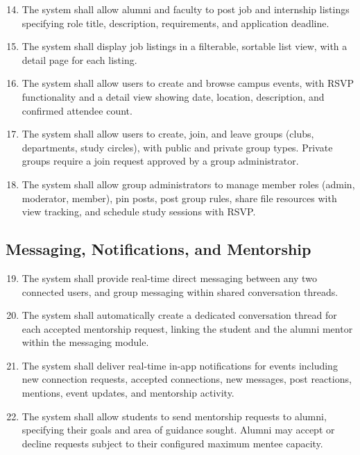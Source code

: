 \documentclass[12pt, a4paper]{article}
\begin{document}
\begin{enumerate}[label=\textbf{FR-\arabic*:}, leftmargin=*, align=left]
\setcounter{enumi}{13}

    \item The system shall allow alumni and faculty to post job and internship
    listings specifying role title, description, requirements, and application
    deadline.

    \item The system shall display job listings in a filterable, sortable list view,
    with a detail page for each listing.

    \item The system shall allow users to create and browse campus events, with RSVP
    functionality and a detail view showing date, location, description, and confirmed
    attendee count.

    \item The system shall allow users to create, join, and leave groups (clubs,
    departments, study circles), with public and private group types. Private groups
    require a join request approved by a group administrator.

    \item The system shall allow group administrators to manage member roles
    (admin, moderator, member), pin posts, post group rules, share file resources
    with view tracking, and schedule study sessions with RSVP.

\end{enumerate}

\subsection{Messaging, Notifications, and Mentorship}

\begin{enumerate}[label=\textbf{FR-\arabic*:}, leftmargin=*, align=left]
\setcounter{enumi}{18}

    \item The system shall provide real-time direct messaging between any two
    connected users, and group messaging within shared conversation threads.

    \item The system shall automatically create a dedicated conversation thread
    for each accepted mentorship request, linking the student and the alumni
    mentor within the messaging module.

    \item The system shall deliver real-time in-app notifications for events including
    new connection requests, accepted connections, new messages, post reactions,
    mentions, event updates, and mentorship activity.

    \item The system shall allow students to send mentorship requests to alumni,
    specifying their goals and area of guidance sought. Alumni may accept or decline
    requests subject to their configured maximum mentee capacity.

\end{enumerate}
\end{document}
